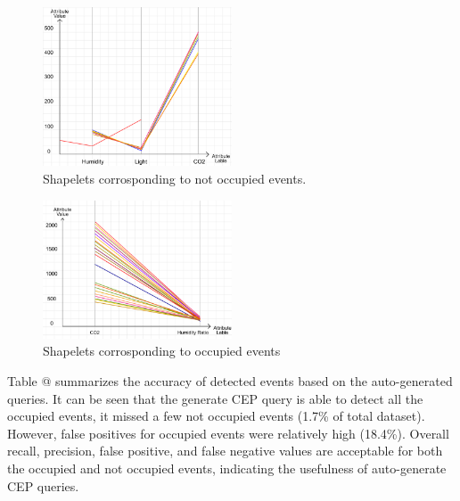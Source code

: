 \documentclass[conference]{IEEEtran}  %
\makeatletter
\newcommand*{\rom}[1]{\expandafter\@slowromancap\romannumeral #1@}
\makeatother
\begin{document}
\begin{figure}
\includegraphics[width=0.5\textwidth]{Occupancy_event1.png}
\caption{Shapelets corrosponding to not occupied events.}
\label{fig:occupancyEvent1}
\squeezeup\squeezeup
\end{figure}

\begin{figure}
\includegraphics[width=0.5\textwidth]{Occupancy_event2.png}
\caption{Shapelets corrosponding to occupied events}
\label{fig:occupancyEvent2}
\squeezeup\squeezeup
\end{figure}


Table \rom{1} summarizes the accuracy of detected events based on the auto-generated queries. It can be seen that the generate CEP query is able to detect all the occupied events, it missed a few not occupied events (1.7\% of total dataset). However, false positives for occupied events were relatively high (18.4\%). Overall recall, precision, false positive, and false negative values are acceptable for both the occupied and not occupied events, indicating the usefulness of auto-generate CEP queries. 
\end{document}

